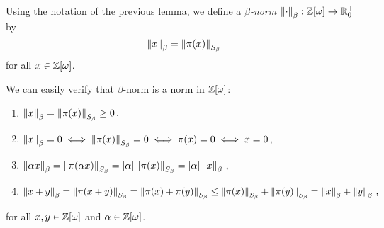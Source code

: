 \begin{defn}
Using the notation of the previous lemma, we define a \emph{$\beta$-norm}  $\normBeta{\cdot}:\Zomega \rightarrow \RR^+_0$ by 
$$
\normBeta{x}=\norm{\pi(x)}{S_\beta}
$$
for all $x\in\Zomega$.
\end{defn}
We can easily verify that $\beta$-norm is a norm in $\Zomega$:
\begin{enumerate}
    \item $\normBeta{x}=\norm{\pi(x)}{S_\beta}\geq 0\,,$
    \item $\normBeta{x}=0 \iff \norm{\pi(x)}{S_\beta}=0 \iff \pi(x)=0 \iff x=0\,,$
    \item $\normBeta{\alpha x}=\norm{\pi(\alpha x)}{S_\beta}=|\alpha|\norm{\pi(x)}{S_\beta}=|\alpha|\normBeta{x}\,,$
    \item $\normBeta{x+y}=\norm{\pi(x+y)}{S_\beta}=\norm{\pi(x)+\pi(y)}{S_\beta}\leq \norm{\pi(x)}{S_\beta}+\norm{\pi(y)}{S_\beta}=\normBeta{x}+\normBeta{y}\,,$
\end{enumerate}
for all $x,y \in \Zomega$ and $\alpha \in \Zomega$.

